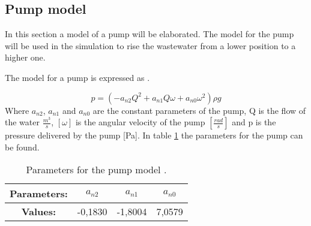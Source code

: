 \subsection{Pump model}\label{se:pump_model}
In this section a model of a pump will be elaborated. The model for the pump will be used in the simulation to rise the wastewater from a lower position to a higher one. 

 The model for a pump is expressed as \cite{kallesoe_pump}.

\begin{equation}\label{sec:eq_pump_exp}
p= (-a_{n2}Q^2+a_{n1}Q\omega+a_{n0}\omega^2)\rho g
\end{equation}
Where $a_{n2}$, $a_{n1}$ and $a_{n0}$ are the constant parameters of the pump, Q is the flow of the water $\frac{m^3}{s}$, $[\omega]$ is the angular velocity of the pump $[\frac{rad}{s}]$ and p is the pressure delivered by the pump [Pa]. In table \ref{tab:pump_parameters} the parameters for the pump can be found.

\begin{table}[H]
\centering
\begin{tabular}{|c|c|c|c|}
\hline
\rowcolor[HTML]{9B9B9B} 
\textbf{Parameters:}                     & \textbf{$a_{n2}$} & \textbf{$a_{n1}$} & \textbf{$a_{n0}$} \\ \hline
\cellcolor[HTML]{9B9B9B}\textbf{Values:} & -0,1830           & -1,8004            & 7,0579              \\ \hline
\end{tabular}
\caption{Parameters for the pump model \cite{kallesoe_pump}.}
\label{tab:pump_parameters}
\end{table}